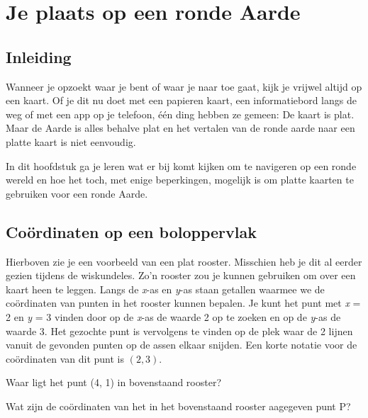 \chapter{Je plaats op een ronde Aarde}

\section{Inleiding}

Wanneer je opzoekt waar je bent of waar je naar toe gaat, kijk je vrijwel altijd op een kaart. Of je dit nu doet met een papieren kaart, een informatiebord langs de weg of met een app op je telefoon, \'e\'en ding hebben ze gemeen: De kaart is plat. Maar de Aarde is alles behalve plat en het vertalen van de ronde aarde naar een platte kaart is niet eenvoudig.

In dit hoofdstuk ga je leren wat er bij komt kijken om te navigeren op een ronde wereld en hoe het toch, met enige beperkingen, mogelijk is om platte kaarten te gebruiken voor een ronde Aarde.

\section{Co\"ordinaten op een boloppervlak}


Hierboven zie je een voorbeeld van een plat rooster. Misschien heb je dit al eerder gezien tijdens de wiskundeles. Zo'n rooster zou je kunnen gebruiken om over een kaart heen te leggen. Langs de \textit{x}-as en \textit{y}-as staan getallen waarmee we de co\"ordinaten van punten in het rooster kunnen bepalen. Je kunt het punt met \textit{x} = 2 en \textit{y} = 3 vinden door op de \textit{x}-as de waarde 2 op te zoeken en op de \textit{y}-as de waarde 3. Het gezochte punt is vervolgens te vinden op de plek waar de 2 lijnen vanuit de gevonden punten op de assen elkaar snijden. Een korte notatie voor de co\"ordinaten van dit punt is $(2, 3)$.

\begin{opgave}
	\begin{subopgave}
		Waar ligt het punt (4, 1) in bovenstaand rooster?
	\end{subopgave}
	\begin{subopgave}
		Wat zijn de co\"ordinaten van het in het bovenstaand rooster aagegeven punt P?
	\end{subopgave}
\end{opgave}


